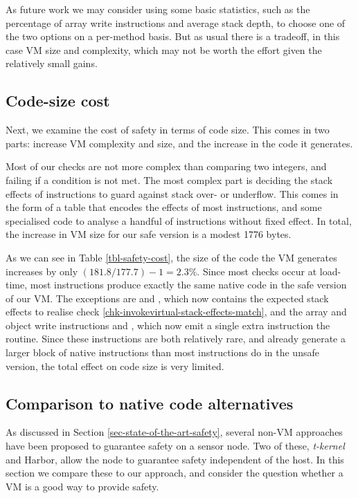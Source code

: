 As future work we may consider using some basic statistics, such as the percentage of array write instructions and average stack depth, to choose one of the two options on a per-method basis. But as usual there is a tradeoff, in this case VM size and complexity, which may not be worth the effort given the relatively small gains.

\subsection{Code-size cost}
Next, we examine the cost of safety in terms of code size. This comes in two parts: increase VM complexity and size, and the increase in the code it generates.

Most of our checks are not more complex than comparing two integers, and failing if a condition is not met. The most complex part is deciding the stack effects of instructions to guard against stack over- or underflow. This comes in the form of a table that encodes the effects of most instructions, and some specialised code to analyse a handful of instructions without fixed effect. In total, the increase in VM size for our safe version is a modest 1776 bytes.

As we can see in Table \ref{tbl-safety-cost}, the size of the code the VM generates increases by only $(181.8/177.7)-1=2.3\%$. Since most checks occur at load-time, most instructions produce exactly the same native code in the safe version of our VM. The exceptions are  and , which now contains the expected stack effects to realise check \ref{chk-invokevirtual-stack-effects-match}, and the array and object write instructions  and , which now emit a single extra  instruction the  routine. Since these instructions are both relatively rare, and already generate a larger block of native instructions than most instructions do in the unsafe version, the total effect on code size is very limited.

\subsection{Comparison to native code alternatives}
As discussed in Section \ref{sec-state-of-the-art-safety}, several non-VM approaches have been proposed to guarantee safety on a sensor node. Two of these, \emph{t-kernel} and Harbor, allow the node to guarantee safety independent of the host. In this section we compare these to our approach, and consider the question whether a VM is a good way to provide safety.

